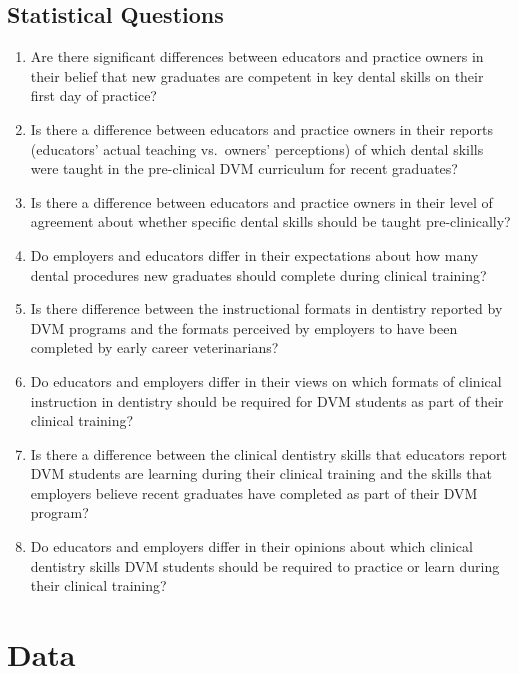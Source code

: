 \documentclass[
  11pt,
  letterpaper,
  DIV=11,
  numbers=noendperiod]{scrartcl}
\numberwithin{figure}{section}
\begin{document}
\hypertarget{statistical-questions}{%
\subsection{Statistical Questions}\label{statistical-questions}}

\begin{enumerate}
\def\labelenumi{\arabic{enumi}.}
\item
  Are there significant differences between educators and practice
  owners in their belief that new graduates are competent in key dental
  skills on their first day of practice?
\item
  Is there a difference between educators and practice owners in their
  reports (educators' actual teaching vs.~owners' perceptions) of which
  dental skills were taught in the pre-clinical DVM curriculum for
  recent graduates?
\item
  Is there a difference between educators and practice owners in their
  level of agreement about whether specific dental skills should be
  taught pre-clinically?
\item
  Do employers and educators differ in their expectations about how many
  dental procedures new graduates should complete during clinical
  training?
\item
  Is there difference between the instructional formats in dentistry
  reported by DVM programs and the formats perceived by employers to
  have been completed by early career veterinarians?
\item
  Do educators and employers differ in their views on which formats of
  clinical instruction in dentistry should be required for DVM students
  as part of their clinical training?
\item
  Is there a difference between the clinical dentistry skills that
  educators report DVM students are learning during their clinical
  training and the skills that employers believe recent graduates have
  completed as part of their DVM program?
\item
  Do educators and employers differ in their opinions about which
  clinical dentistry skills DVM students should be required to practice
  or learn during their clinical training?
\end{enumerate}

\hypertarget{data}{%
\section{Data}\label{data}}
\end{document}
